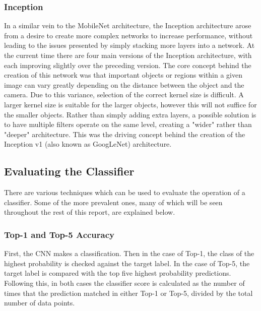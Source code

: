 \documentclass[12pt]{report}
\begin{document}
\subsubsection{Inception}
\begin{flushleft}
In a similar vein to the MobileNet architecture, the Inception architecture arose from a desire to create more complex networks to increase performance, without leading to the issues presented by simply stacking more layers into a  network. At the current time there are four main versions of the Inception architecture, with each improving slightly over the preceding version. The core concept behind the creation of this network was that important objects or regions within a given image can vary greatly depending on the distance between the object and the camera. Due to this variance, selection of the correct kernel size is difficult. A larger kernel size is suitable for the larger objects, however this will not suffice for the smaller objects. Rather than simply adding extra layers, a possible solution is to have multiple filters operate on the same level, creating a "wider" rather than "deeper" architecture. This was the driving concept behind the creation of the Inception v1 (also known as GoogLeNet) architecture.
\end{flushleft}

\newpage
\subsection{Evaluating the Classifier}
\begin{flushleft}
There are various techniques which can be used to evaluate the operation of a classifier. Some of the more prevalent ones, many of which will be seen throughout the rest of this report, are explained below.
\end{flushleft}

\subsubsection{Top-1 and Top-5 Accuracy}
\begin{flushleft}
First, the CNN makes a classification. Then in the case of Top-1, the class of the highest probability is checked against the target label. In the case of Top-5, the target label is compared with the top five highest probability predictions. Following this, in both cases the classifier score is calculated as the number of times that the prediction matched in either Top-1 or Top-5, divided by the total number of data points.
\end{flushleft}
\end{document}
